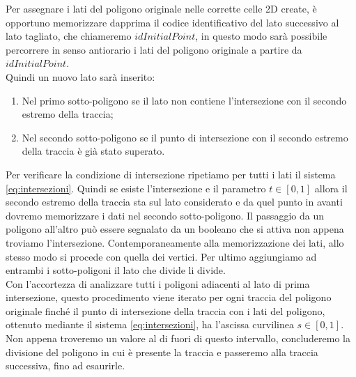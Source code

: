 \documentclass[a4paper]{article}
\begin{document}
Per assegnare i lati del poligono originale nelle corrette celle 2D create, è opportuno memorizzare dapprima il codice identificativo del lato successivo al lato tagliato, che chiameremo $idInitialPoint$,  in questo modo sarà possibile percorrere in senso antiorario i lati del poligono originale a partire da $idInitialPoint$. \\ [1.5mm]
Quindi un nuovo lato sarà inserito: 
\begin{enumerate} 
\item Nel primo sotto-poligono se il lato non contiene l'intersezione con il secondo estremo della traccia;
\item Nel secondo sotto-poligono se il punto di intersezione con il secondo estremo della traccia è già stato superato.
\end{enumerate}
Per verificare la condizione di intersezione ripetiamo per tutti i lati il sistema \eqref{eq:intersezioni}. Quindi se esiste l'intersezione e il parametro $t \in [0,1]$ allora il secondo estremo della traccia sta sul lato considerato e da quel punto in avanti dovremo memorizzare i dati nel secondo sotto-poligono. Il passaggio da un poligono all'altro può essere segnalato da un booleano che si attiva non appena troviamo l'intersezione. Contemporaneamente alla memorizzazione dei lati, allo stesso modo si procede con quella dei vertici. Per ultimo aggiungiamo ad entrambi i sotto-poligoni il lato che divide li divide.
\\ [2mm]
Con l'accortezza di analizzare tutti i poligoni adiacenti al lato di prima intersezione, questo procedimento viene iterato per ogni traccia del poligono originale finché il punto di intersezione della traccia con i lati del poligono, ottenuto mediante il sistema \eqref{eq:intersezioni}, ha l'ascissa curvilinea $s \in [0,1]$. Non appena troveremo un valore al di fuori di questo intervallo, concluderemo la divisione del poligono in cui è presente la traccia e passeremo alla traccia successiva, fino ad esaurirle.
\end{document}
